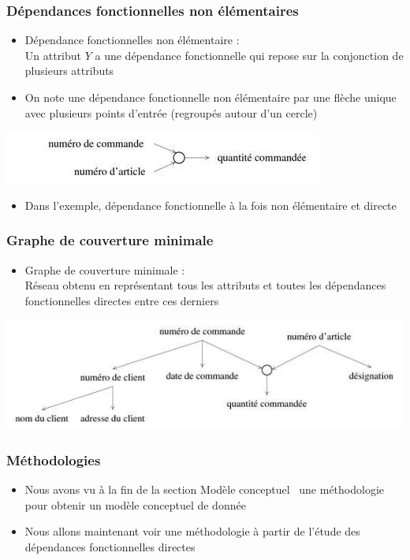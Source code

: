 \begin{frame}
  \frametitle{Dépendances fonctionnelles non élémentaires}
  \begin{itemize}
    \item Dépendance fonctionnelles non élémentaire :\\
      Un attribut $Y$ a une dépendance fonctionnelle qui repose sur la conjonction de plusieurs
      attributs
    \item On note une dépendance fonctionnelle non élémentaire par une flèche unique avec plusieurs points
      d'entrée (regroupés autour d'un cercle)
  \end{itemize}
  \begin{center}
    \includegraphics[width=0.9\linewidth]{dependance_fonctionnelle_non_elementaire.jpg}
  \end{center}
  \begin{itemize}
  \item Dans l'exemple, dépendance fonctionnelle à la fois non élémentaire et directe
  \end{itemize}
\end{frame}

\begin{frame}
  \frametitle{Graphe de couverture minimale}
  \begin{itemize}
    \item Graphe de couverture minimale :\\
      Réseau obtenu en représentant tous les attributs et toutes les dépendances fonctionnelles directes entre
      ces derniers
  \end{itemize}
  \begin{center}
    \includegraphics[width=0.9\linewidth]{graphe_couverture_minimale.jpg}
  \end{center}
\end{frame}

\begin{frame}
  \frametitle{Méthodologies}
  \begin{itemize}
    \item Nous avons vu à la fin de la section \og Modèle conceptuel \fg\ une méthodologie pour obtenir un
      modèle conceptuel de donnée
    \item Nous allons maintenant voir une méthodologie à partir de l'étude des dépendances fonctionnelles
      directes
  \end{itemize}
\end{frame}

